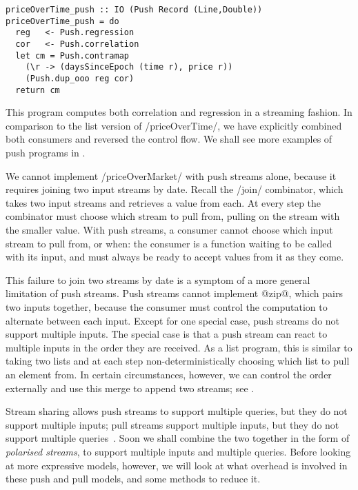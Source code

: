 \begin{lstlisting}
priceOverTime_push :: IO (Push Record (Line,Double))
priceOverTime_push = do
  reg   <- Push.regression
  cor   <- Push.correlation
  let cm = Push.contramap
    (\r -> (daysSinceEpoch (time r), price r))
    (Push.dup_ooo reg cor)
  return cm
\end{lstlisting}

This program computes both correlation and regression in a streaming fashion.
In comparison to the list version of \Hs/priceOverTime/, we have explicitly combined both consumers and reversed the control flow.
We shall see more examples of push programs in .

We cannot implement \Hs/priceOverMarket/ with push streams alone, because it requires joining two input streams by date.
Recall the \Hs/join/ combinator, which takes two input streams and retrieves a value from each.
At every step the combinator must choose which stream to pull from, pulling on the stream with the smaller value.
With push streams, a consumer cannot choose which input stream to pull from, or when: the consumer is a function waiting to be called with its input, and must always be ready to accept values from it as they come.

This failure to join two streams by date is a symptom of a more general limitation of push streams.
Push streams cannot implement @zip@, which pairs two inputs together, because the consumer must control the computation to alternate between each input.
Except for one special case, push streams do not support multiple inputs.
The special case is that a push stream can react to multiple inputs in the order they are received.
As a list program, this is similar to taking two lists and at each step non-deterministically choosing which list to pull an element from.
In certain circumstances, however, we can control the order externally and use this merge to append two streams; see .

Stream sharing allows push streams to support multiple queries, but they do not support multiple inputs; pull streams support multiple inputs, but they do not support multiple queries~\citep{kay2009you}.
Soon  we shall combine the two together in the form of \emph{polarised streams}, to support multiple inputs and multiple queries.
Before looking at more expressive models, however, we will look at what overhead is involved in these push and pull models, and some methods to reduce it.

